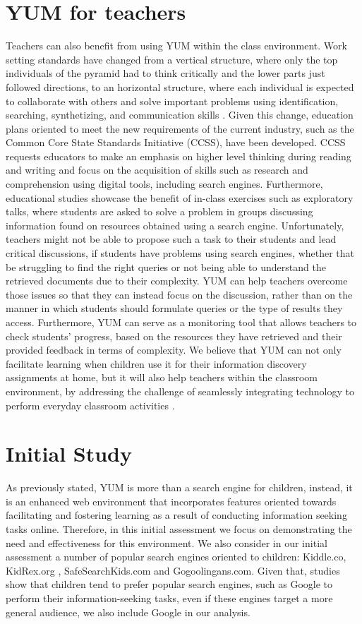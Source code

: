 \documentclass{sig-alternate-05-2015}
\begin{document}
\section{YUM for teachers}
Teachers can also benefit from using YUM within the class environment. Work setting standards have changed from a vertical structure, where only the top individuals of the pyramid had to think critically and the lower parts just followed directions, to an horizontal structure, where each individual is expected to collaborate with others and solve important problems using identification, searching, synthetizing, and communication skills \cite{leu13}. Given this change, education plans oriented to meet the new requirements of the current industry, such as the Common Core State Standards Initiative (CCSS), have been developed. CCSS requests educators to make an emphasis on higher level thinking during reading and writing and focus on the acquisition of skills such as research and comprehension using digital tools, including search engines\cite{leu13}. Furthermore, educational studies \cite{kni15} showcase the benefit of in-class exercises such as  exploratory talks, where students are asked to solve a problem in groups discussing information found on resources obtained using a search engine. Unfortunately, teachers might not be able to propose such a task to their students and lead critical discussions, if students have problems using search engines, whether that be struggling to  find the right queries or not being able to  understand the retrieved documents due to their complexity. YUM can help teachers overcome those issues so that they can instead focus on the discussion, rather than on the manner in which students should formulate queries or the type of results they access. Furthermore, YUM can serve as a monitoring tool that allows teachers to check students' progress, based on the resources they have retrieved and their provided feedback in terms of complexity. We believe that  YUM can  not only facilitate learning when children use it for their information discovery assignments at home, but it will also help teachers within the classroom environment, by  addressing the challenge of seamlessly integrating technology to perform everyday classroom activities \cite{Dan13,kni15}.




\section{Initial Study}
As previously stated, YUM is more than a search engine for children, instead, it is an enhanced web environment that incorporates features oriented towards facilitating and fostering learning as a result of conducting information seeking tasks online. Therefore, in this initial assessment we focus on demonstrating the need and effectiveness for this environment. We also consider in our initial assessment a number of popular search engines oriented to children:  Kiddle.co, KidRex.org , SafeSearchKids.com and Gogoolingans.com. Given that, studies show that children tend to prefer popular search engines, such as Google to perform their information-seeking tasks\cite{Bil13}, even if these engines target a more general audience, we also include Google in our analysis. 
\end{document}
